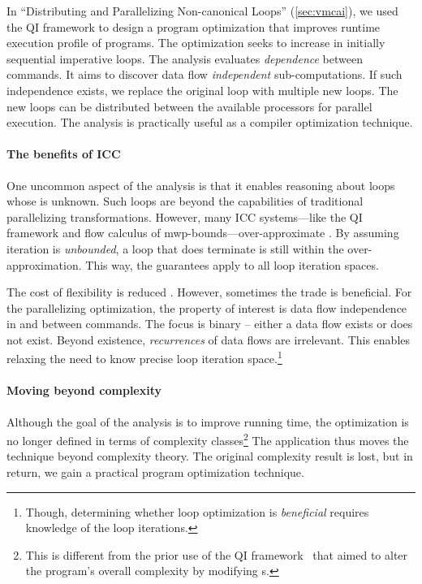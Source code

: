 In \enquote{Distributing and Parallelizing Non-canonical Loops}
(\autoref{sec:vmcai}), we used the QI framework to design a program optimization
that improves runtime execution profile of programs. The optimization seeks to
increase  in initially sequential imperative
loops. The analysis evaluates \emph{dependence}
between commands. It aims to discover data flow \emph{independent}
sub-computations. If such independence exists, we
replace the original loop with multiple new loops. The new loops can be
distributed between the available
processors for parallel execution. The analysis is practically useful as a
compiler optimization technique.

\paragraph*{The benefits of ICC}
One uncommon aspect of the analysis is that it enables reasoning about loops whose
 is unknown. Such loops are beyond the capabilities of
traditional parallelizing transformations. However, many ICC systems---like the
QI framework and flow calculus of mwp-bounds---over-approximate . By assuming iteration is \emph{unbounded}, a loop that does
terminate is still within the over-approximation.
This way, the guarantees apply to all loop iteration spaces.

The cost of flexibility is reduced . However, sometimes the trade
is beneficial. For the parallelizing optimization, the property of interest is
data flow independence in and between commands. The focus is binary -- either a
data flow exists or does not exist. Beyond existence, \emph{recurrences} of data
flows are irrelevant. This enables relaxing the need to know precise loop
iteration space.\footnote{Though, determining whether loop optimization is
\emph{beneficial} requires knowledge of the loop iterations.}

\paragraph*{Moving beyond complexity}
Although the goal of the analysis is to improve running time, the optimization
is no longer defined in terms of complexity classes\footnote{This is different
from the prior use of the QI framework~\cite{moyen20172} that aimed to alter the
program's overall complexity by modifying s.} The application
thus moves the technique beyond complexity theory. The original complexity
result is lost, but in return, we gain a practical program optimization
technique.

